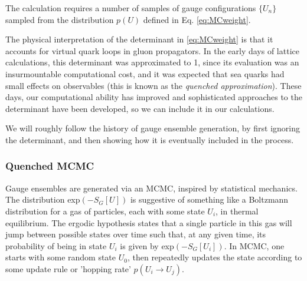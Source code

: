 The calculation requires a number of samples of gauge configurations $\{U_n\}$ sampled from the distribution $p(U)$ defined in Eq. \eqref{eq:MCweight}.

The physical interpretation of the determinant in \eqref{eq:MCweight} is that it accounts for virtual quark loops in gluon propagators. In the early days of lattice calculations, this determinant was approximated to 1, since its evaluation was an insurmountable computational cost, and it was expected that sea quarks had small effects on observables (this is known as the {\it{quenched approximation}}). These days, our computational ability has improved and sophisticated approaches to the determinant have been developed, so we can include it in our calculations.

We will roughly follow the history of gauge ensemble generation, by first ignoring the determinant, and then showing how it is eventually included in the process.

\subsubsection{Quenched MCMC}

Gauge ensembles are generated via an MCMC, inspired by statistical mechanics. The distribution exp$(-S_G[U])$ is suggestive of something like a Boltzmann distribution for a gas of particles, each with some state $U_i$, in thermal equilibrium. The ergodic hypothesis states that a single particle in this gas will jump between possible states over time such that, at any given time, its probability of being in state $U_i$ is given by exp$(-S_G[U_i])$. In MCMC, one starts with some random state $U_0$, then repeatedly updates the state according to some update rule or 'hopping rate' $p(U_i\to U_j)$. 

